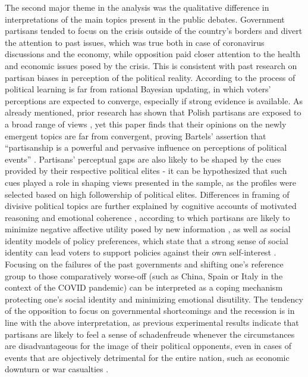 \documentclass{article}
\begin{document}
	The second major theme in the analysis was the qualitative difference in interpretations of the main topics present in the public debates. Government partisans tended to focus on the crisis outside of the country’s borders and divert the attention to past issues, which was true both in case of coronavirus discussions and the economy, while opposition paid closer attention to the health and economic issues posed by the crisis. This is consistent with past research on partisan biases in perception of the political reality. According to \citet{bartels2002} the process of political learning is far from rational Bayesian updating, in which voters’ perceptions are expected to converge, especially if strong evidence is available. As already mentioned, prior research has shown that Polish partisans are exposed to a broad range of views \citep{matuszewski2018}, yet this paper finds that their opinions on the newly emergent topics are far from convergent, proving Bartels’ assertion that “partisanship is a powerful and pervasive influence on perceptions of political events” \citet[][pp. 120]{bartels2002}. Partisans’ perceptual gaps are also likely to be shaped by the cues provided by their respective political elites \citep{bisgaard2018} - it can be hypothesized that such cues played a role in shaping views presented in the sample, as the profiles were selected based on high followership of political elites. Differences in framing of divisive political topics are further explained by cognitive accounts of motivated reasoning \citep{kunda1990} and emotional coherence \citep{thagard2003}, according to which partisans are likely to minimize negative affective utility posed by new information \citep[see e.g.][]{westen2006}, as well as social identity models of policy preferences, which state that a strong sense of social identity can lead voters to support policies against their own self-interest \citep{shayo2009, klor2010}. Focusing on the failures of the past governments and shifting one’s reference group to those comparatively worse-off (such as China, Spain or Italy in the context of the COVID pandemic) can be interpreted as a coping mechanism protecting one’s social identity and minimizing emotional disutility. The tendency of the opposition to focus on governmental shortcomings and the recession is in line with the above interpretation, as previous experimental results indicate that partisans are likely to feel a sense of schadenfreude whenever the circumstances are disadvantageous for the image of their political opponents, even in cases of events that are objectively detrimental for the entire nation, such as economic downturn or war casualties \citep{combs2009}. 
	
\end{document}

